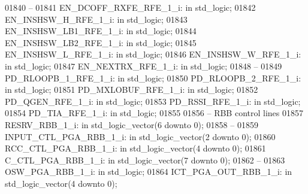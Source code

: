 \begin{DoxyCode}
01840 \textcolor{keyword}{    --}
01841     EN\_DCOFF\_RXFE\_RFE\_1\_i:  \textcolor{keywordflow}{in} \textcolor{comment}{std\_logic};
01842     EN\_INSHSW\_H\_RFE\_1\_i:    \textcolor{keywordflow}{in} \textcolor{comment}{std\_logic};
01843     EN\_INSHSW\_LB1\_RFE\_1\_i:  \textcolor{keywordflow}{in} \textcolor{comment}{std\_logic};
01844     EN\_INSHSW\_LB2\_RFE\_1\_i:  \textcolor{keywordflow}{in} \textcolor{comment}{std\_logic};
01845     EN\_INSHSW\_L\_RFE\_1\_i:    \textcolor{keywordflow}{in} \textcolor{comment}{std\_logic};
01846     EN\_INSHSW\_W\_RFE\_1\_i:    \textcolor{keywordflow}{in} \textcolor{comment}{std\_logic};
01847     EN\_NEXTRX\_RFE\_1\_i:  \textcolor{keywordflow}{in} \textcolor{comment}{std\_logic};
01848 \textcolor{keyword}{    --}
01849     PD\_RLOOPB\_1\_RFE\_1\_i:    \textcolor{keywordflow}{in} \textcolor{comment}{std\_logic};
01850     PD\_RLOOPB\_2\_RFE\_1\_i:    \textcolor{keywordflow}{in} \textcolor{comment}{std\_logic};
01851     PD\_MXLOBUF\_RFE\_1\_i: \textcolor{keywordflow}{in} \textcolor{comment}{std\_logic};
01852     PD\_QGEN\_RFE\_1\_i:    \textcolor{keywordflow}{in} \textcolor{comment}{std\_logic};
01853     PD\_RSSI\_RFE\_1\_i:    \textcolor{keywordflow}{in} \textcolor{comment}{std\_logic};
01854     PD\_TIA\_RFE\_1\_i: \textcolor{keywordflow}{in} \textcolor{comment}{std\_logic};
01855 
01856 \textcolor{keyword}{    -- RBB control lines }
01857     RESRV\_RBB\_1\_i:  \textcolor{keywordflow}{in} \textcolor{comment}{std\_logic\_vector}(\textcolor{vhdllogic}{}\textcolor{vhdllogic}{6} \textcolor{keywordflow}{downto} \textcolor{vhdllogic}{}\textcolor{vhdllogic}{0});
01858 \textcolor{keyword}{    --}
01859     INPUT\_CTL\_PGA\_RBB\_1\_i:  \textcolor{keywordflow}{in} \textcolor{comment}{std\_logic\_vector}(\textcolor{vhdllogic}{}\textcolor{vhdllogic}{2} \textcolor{keywordflow}{downto} \textcolor{vhdllogic}{}\textcolor{vhdllogic}{0});
01860     RCC\_CTL\_PGA\_RBB\_1\_i:    \textcolor{keywordflow}{in} \textcolor{comment}{std\_logic\_vector}(\textcolor{vhdllogic}{}\textcolor{vhdllogic}{4} \textcolor{keywordflow}{downto} \textcolor{vhdllogic}{}\textcolor{vhdllogic}{0});
01861     C\_CTL\_PGA\_RBB\_1\_i:  \textcolor{keywordflow}{in} \textcolor{comment}{std\_logic\_vector}(\textcolor{vhdllogic}{}\textcolor{vhdllogic}{7} \textcolor{keywordflow}{downto} \textcolor{vhdllogic}{}\textcolor{vhdllogic}{0});
01862 \textcolor{keyword}{    --}
01863     OSW\_PGA\_RBB\_1\_i:    \textcolor{keywordflow}{in} \textcolor{comment}{std\_logic};
01864     ICT\_PGA\_OUT\_RBB\_1\_i:    \textcolor{keywordflow}{in} \textcolor{comment}{std\_logic\_vector}(\textcolor{vhdllogic}{}\textcolor{vhdllogic}{4} \textcolor{keywordflow}{downto} \textcolor{vhdllogic}{}\textcolor{vhdllogic}{0});

\end{DoxyCode}
